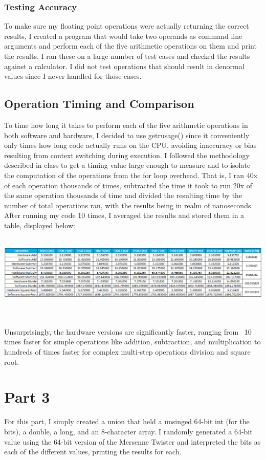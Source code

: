 \documentclass[12pt]{article}%
\begin{document}
\subsubsection{Testing Accuracy}
To make sure my floating point operations were actually returning the correct results, I created a program that would take two operands as command line arguments and perform each of the five arithmetic operations on them and print the results. I ran these on a large number of test cases and checked the results against a calculator. I did not test operations that should result in denormal values since I never handled for those cases.
\subsection{Operation Timing and Comparison}
To time how long it takes to perform each of the five arithmetic operations in both software and hardware, I decided to use getrusage() since it conveniently only times how long code actually runs on the CPU, avoiding inaccuracy or bias resulting from context switching during execution. I followed the methodology described in class to get a timing value large enough to measure and to isolate the computation of the operations from the for loop overhead. That is, I ran 40x of each operation thousands of times, subtracted the time it took to run 20x of the same operation thousands of time and divided the resulting time by the number of total operations ran, with the results being in realm of nanoseconds. After running my code 10 times, I averaged the results and stored them in a table, displayed below:\\ \\
\begin{minipage}{\linewidth}
\begin{center}
\includegraphics[width=\textwidth]{timing_data.eps}
\end{center}
\end{minipage}
\\ \\Unsurprisingly, the hardware versions are significantly faster, ranging from ~10 times faster for simple operations like addition, subtraction, and multiplication to hundreds of times faster for complex multi-step operations division and square root.
\section{Part 3}
For this part, I simply created a union that held a unsinged 64-bit int (for the bits), a double, a long, and an 8-character array. I randomly generated a 64-bit value using the 64-bit version of the Mersenne Twister and interpreted the bits as each of the different values, printing the results for each.
\end{document}
